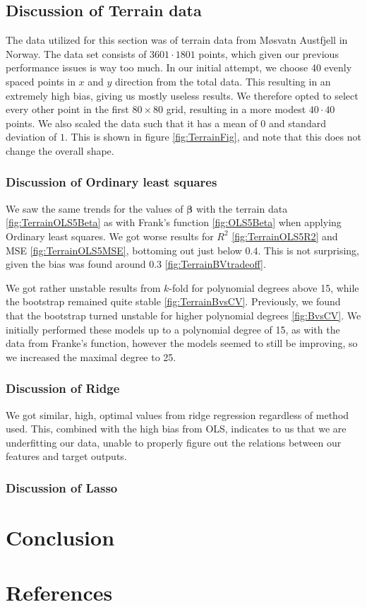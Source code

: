 \documentclass{article}
\begin{document}
\subsection{Discussion of Terrain data}
The data utilized for this section was of terrain data from Møsvatn Austfjell in Norway. The data set consists of $3601 \cdot 1801$ points, which given our previous performance issues is way too much. In our initial attempt, we choose 40 evenly spaced points in $x$ and $y$ direction from the total data. This resulting in an extremely high bias, giving us mostly useless results. We therefore opted to select every other point in the first $80 \times 80$ grid, resulting in a more modest $40 \cdot 40$ points. We also scaled the data such that it has a mean of $0$ and standard deviation of $1$. This is shown in figure \ref{fig:TerrainFig}, and note that this does not change the overall shape.

\subsubsection{Discussion of Ordinary least squares}
We saw the same trends for the values of $\boldsymbol{\beta}$ with the terrain data \ref{fig:TerrainOLS5Beta} as with Frank's function \ref{fig:OLS5Beta} when applying Ordinary least squares. We got worse results for $R^2$ \ref{fig:TerrainOLS5R2} and MSE \ref{fig:TerrainOLS5MSE}, bottoming out just below $0.4$. This is not surprising, given the bias was found around $0.3$ \ref{fig:TerrainBVtradeoff}.

We got rather unstable results from $k$-fold for polynomial degrees above 15, while the bootstrap remained quite stable \ref{fig:TerrainBvsCV}. Previously, we found that the bootstrap turned unstable for higher polynomial degrees \ref{fig:BvsCV}. We initially performed these models up to a polynomial degree of 15, as with the data from Franke's function, however the models seemed to still be improving, so we increased the maximal degree to 25.

\subsubsection{Discussion of Ridge}
We got similar, high, optimal values from ridge regression regardless of method used. This, combined with the high bias from OLS, indicates to us that we are underfitting our data, unable to properly figure out the relations between our features and target outputs.

\subsubsection{Discussion of Lasso}

\section{Conclusion}

\section{References}

\end{document}
